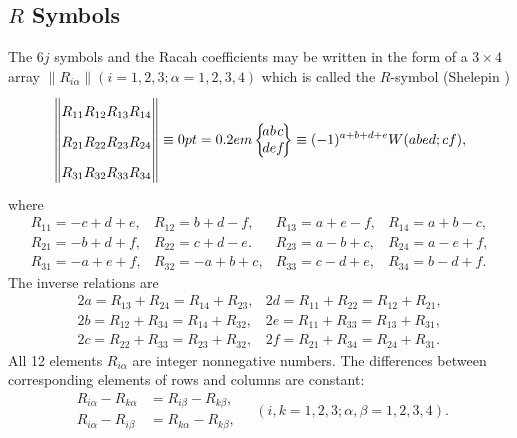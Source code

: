 \subsection{$R$ Symbols}\label{sec:9.1.3}
The $6 j$ symbols and the Racah coefficients may be written in the form of a $3 \times 4$ array $\left\|R_{i \alpha}\right\|(i=1,2,3 ; \alpha= 1,2,3,4)$ which is called the $R$-symbol (Shelepin \cite{ref105})
\begin{equation}
\left\|\begin{array}{llll}
R_{11} & R_{12} & R_{13} & R_{14}  \label{eq:9:1:12}\\
R_{21} & R_{22} & R_{23} & R_{24} \\
R_{31} & R_{32} & R_{33} & R_{34}
\end{array}\right\| \equiv\sixj{a}{b}{c}{d}{e}{f} \equiv(-1)^{a+b+d+e} W(a b e d; c f) ,
\end{equation}
where
\begin{equation}
\begin{array}{llll}
R_{11}=-c+d+e, & R_{12}=b+d-f, & R_{13}=a+e-f, & R_{14}=a+b-c, \\
R_{21}=-b+d+f, & R_{22}=c+d-e . & R_{23}=a-b+c, & R_{24}=a-e+f, \\
R_{31}=-a+e+f, & R_{32}=-a+b+c, & R_{33}=c-d+e, & R_{34}=b-d+f . \label{eq:9:1:13}
\end{array}
\end{equation}
The inverse relations are
\begin{equation}
\begin{array}{ll}
2 a=R_{13}+R_{24}=R_{14}+R_{23}, & 2 d=R_{11}+R_{22}=R_{12}+R_{21}, \\
2 b=R_{12}+R_{34}=R_{14}+R_{32}, & 2 e=R_{11}+R_{33}=R_{13}+R_{31}, \\
2 c=R_{22}+R_{33}=R_{23}+R_{32}, & 2 f=R_{21}+R_{34}=R_{24}+R_{31} . \label{eq:9:1:14}
\end{array}
\end{equation}
All 12 elements $R_{i \alpha}$ are integer nonnegative numbers. The differences between corresponding elements of rows and columns are constant:
\begin{equation}
\begin{aligned}
R_{i \alpha}-R_{k \alpha} & =R_{i \beta}-R_{k \beta}, \\
R_{i \alpha}-R_{i \beta} & =R_{k \alpha}-R_{k \beta}, 
\end{aligned}\quad(i, k=1,2,3 ; \alpha, \beta=1,2,3,4) .
\end{equation}
